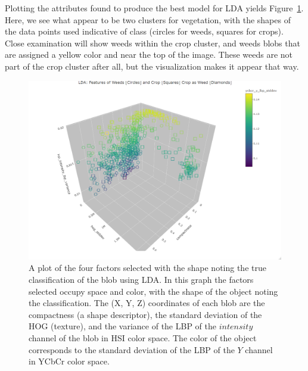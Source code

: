 \documentclass[letterpaper, notitlepage]{report}
\begin{document}
 

Plotting the attributes found to produce the best model for \gls{LDA} yields Figure~\ref{fig:factors}. Here, we see what appear to be two clusters for vegetation, with the shapes of the data points used indicative of class (circles for weeds, squares for crops).  Close examination will show weeds within the crop cluster, and weeds blobs that are assigned a yellow color and near the top of the image. These weeds are not part of the crop cluster after all, but the visualization makes it appear that way.

 \begin{figure}[H]
	\centering
	\includegraphics[width=1.0\linewidth]{./figures/plot-factors.png}
	\caption[Factors selected for discrimination]{A plot of the four factors selected with the shape noting the true classification of the blob using \gls{LDA}. In this graph the factors selected occupy space and color, with the shape of the object noting the classification. The (X, Y, Z) coordinates of each blob are the compactness (a shape descriptor), the standard deviation of the HOG (texture), and the variance of the LBP of the $intensity$ channel of the blob in HSI color space. The color of the object corresponds to the standard deviation of the LBP of the $Y$ channel in YCbCr color space.}
	\label{fig:factors}
\end{figure}
\end{document}
